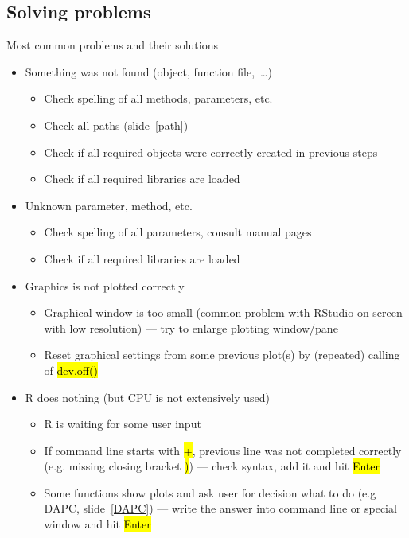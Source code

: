 \documentclass[compress, ucs, xelatex, 11pt, xcolor=svgnames,
  hyperref={
    bookmarks=true,
    unicode=true,
    colorlinks=true,
    pdftitle={Molecular data in R},
    plainpages=false,
    pdfauthor={Vojtech Zeisek},
    pdfsubject={Course about phylogeny and evolution in R},
    pdfcreator={XeLaTeX},
    pdfkeywords={R, evolution, phylogeny, molecular data},
    linkcolor=Tomato,
    anchorcolor=SaddleBrown,
    citecolor=Goldenrod,
    filecolor=DarkMagenta,
    menucolor=Sienna,
    urlcolor=DarkTurquoise,
    pdftex},
  url={hyphens, lowtilde} %
  ]{beamer}
\renewcommand{\texttt}[1]{\hl{\ttfamily #1}}
\begin{document}
\subsection{Solving problems}

\begin{frame}[allowframebreaks]{Most common problems and their solutions}
  \label{problems}
  \begin{itemize}
    \item Something was not found (object, function file,~\ldots)
    \begin{itemize}
      \item Check spelling of all methods, parameters, etc.
      \item Check all paths (slide~\ref{path})
      \item Check if all required objects were correctly created in previous steps
      \item Check if all required libraries are loaded
    \end{itemize}
    \item Unknown parameter, method, etc.
    \begin{itemize}
      \item Check spelling of all parameters, consult manual pages
      \item Check if all required libraries are loaded
    \end{itemize}
    \item Graphics is not plotted correctly
    \begin{itemize}
      \item Graphical window is too small (common problem with RStudio on screen with low resolution) --- try to enlarge plotting window/pane
      \item Reset graphical settings from some previous plot(s) by (repeated) calling of \texttt{dev.off()}
    \end{itemize}
    \item R does nothing (but CPU is not extensively used)
    \begin{itemize}
      \item R is waiting for some user input
      \item If command line starts with \texttt{+}, previous line was not completed correctly (e.g. missing closing bracket \texttt{)}) --- check syntax, add it and hit \texttt{Enter}
      \item Some functions show plots and ask user for decision what to do (e.g DAPC, slide~\ref{DAPC}) --- write the answer into command line or special window and hit \texttt{Enter}

\end{itemize}
\end{itemize}
\end{frame}
\end{document}
